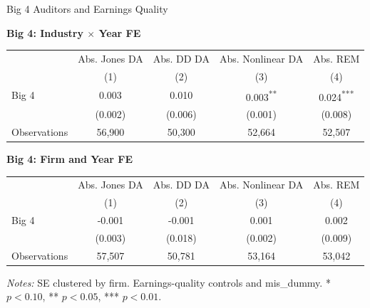 \documentclass[10pt]{article}
\newcommand{\sym}[1]{\textsuperscript{#1}}
\begin{document}
\fontsize{10}{12}\selectfont
\setlength{\tabcolsep}{3pt}\renewcommand{\arraystretch}{1.15}
\begin{center}\large Big 4 Auditors and Earnings Quality\end{center}
\medskip\textbf{Big 4: Industry $\times$ Year FE}\par\smallskip
\begin{tabular*}{\textwidth}{@{\extracolsep{\fill}}lcccc@{}}
\toprule
 & Abs. Jones DA & Abs. DD DA & Abs. Nonlinear DA & Abs. REM \\
 & (1) & (2) & (3) & (4) \\
\midrule
Big 4 & 0.003 & 0.010 & 0.003\sym{**} & 0.024\sym{***} \\
 & (0.002) & (0.006) & (0.001) & (0.008) \\
Observations & 56,900 & 50,300 & 52,664 & 52,507 \\
\bottomrule\end{tabular*}\par
\medskip\textbf{Big 4: Firm and Year FE}\par\smallskip
\begin{tabular*}{\textwidth}{@{\extracolsep{\fill}}lcccc@{}}
\toprule
 & Abs. Jones DA & Abs. DD DA & Abs. Nonlinear DA & Abs. REM \\
 & (1) & (2) & (3) & (4) \\
\midrule
Big 4 & -0.001 & -0.001 & 0.001 & 0.002 \\
 & (0.003) & (0.018) & (0.002) & (0.009) \\
Observations & 57,507 & 50,781 & 53,164 & 53,042 \\
\bottomrule\end{tabular*}\par
\medskip\fontsize{9}{11}\selectfont\textit{Notes:} SE clustered by firm. Earnings-quality controls and mis\_dummy. * $p<0.10$, ** $p<0.05$, *** $p<0.01$.
\end{document}
